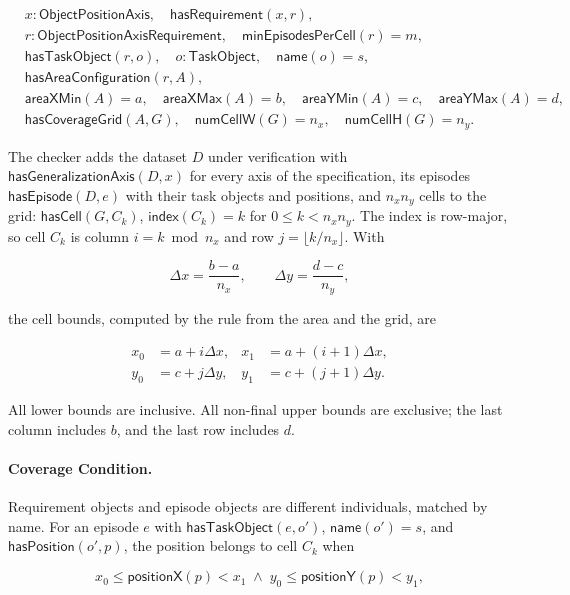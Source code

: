 \documentclass[11pt]{article}
\begin{document}
\[
\begin{aligned}
& x : \mathsf{ObjectPositionAxis},\quad \mathsf{hasRequirement}(x,r),\\
& r : \mathsf{ObjectPositionAxisRequirement},\quad \mathsf{minEpisodesPerCell}(r)=m,\\
& \mathsf{hasTaskObject}(r,o),\quad o : \mathsf{TaskObject},\quad \mathsf{name}(o)=s,\\
& \mathsf{hasAreaConfiguration}(r,A),\\
& \mathsf{areaXMin}(A)=a,\quad \mathsf{areaXMax}(A)=b,\quad
  \mathsf{areaYMin}(A)=c,\quad \mathsf{areaYMax}(A)=d,\\
& \mathsf{hasCoverageGrid}(A,G),\quad \mathsf{numCellW}(G)=n_x,\quad \mathsf{numCellH}(G)=n_y.
\end{aligned}
\]

The checker adds the dataset \(D\) under verification with \(\mathsf{hasGeneralizationAxis}(D,x)\) for every axis of
the specification, its episodes \(\mathsf{hasEpisode}(D,e)\) with their task objects and positions, and \(n_x n_y\)
cells to the grid: \(\mathsf{hasCell}(G,C_k)\), \(\mathsf{index}(C_k)=k\) for \(0\leq k<n_x n_y\). The index is
row-major, so cell \(C_k\) is column \(i=k \bmod n_x\) and row \(j=\lfloor k/n_x\rfloor\). With

\[
\Delta x=\frac{b-a}{n_x},\qquad
\Delta y=\frac{d-c}{n_y},
\]

the cell bounds, computed by the rule from the area and the grid, are

\[
\begin{aligned}
  x_0 &= a+i\Delta x, & x_1 &= a+(i+1)\Delta x,\\
  y_0 &= c+j\Delta y, & y_1 &= c+(j+1)\Delta y.
\end{aligned}
\]

All lower bounds are inclusive. All non-final upper bounds are exclusive; the
last column includes \(b\), and the last row includes \(d\).

\paragraph{Coverage Condition.}

Requirement objects and episode objects are different individuals, matched by name. For an episode \(e\) with
\(\mathsf{hasTaskObject}(e,o')\), \(\mathsf{name}(o')=s\), and \(\mathsf{hasPosition}(o',p)\), the position belongs
to cell \(C_k\) when

\[
x_0\leq \mathsf{positionX}(p)<x_1
\;\land\; y_0\leq \mathsf{positionY}(p)<y_1,
\]
\end{document}
